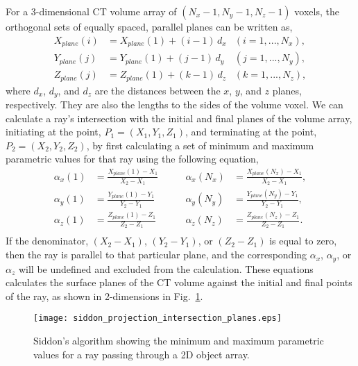 For a 3-dimensional CT volume array of $(N_x -1, N_y-1, N_z-1)$ voxels, the orthogonal sets of equally spaced, parallel planes can be written as,
%
\begin{equation}
	\begin{aligned}
		X_{plane}(i) & = X_{plane}(1) + (i-1)\, d_x 	&(i = 1, ..., N_x),\\ 
		Y_{plane}(j) & = Y_{plane}(1) + (j-1)\, d_y  	&(j = 1, ..., N_y),\\
		Z_{plane}(j) & = Z_{plane}(1) + (k-1)\, d_z		&(k = 1, ..., N_z),
	\end{aligned}
	\label{eq:siddon_planes}
\end{equation}
%
where $d_x$, $d_y$, and $d_z$ are the distances between the $x$, $y$, and $z$ planes, respectively.  They are also the lengths to the sides of the volume voxel.  We can calculate a ray's intersection with the initial and final planes of the volume array, initiating at the point, $P_1 = (X_1, Y_1, Z_1)$, and terminating at the point, $P_2 = (X_2, Y_2, Z_2)$, by first calculating a set of minimum and maximum parametric values for that ray using the following equation,
%
\begin{equation}
\begin{aligned}
\alpha_x(1) &= \frac{X_{plane}(1) - X_1}{X_2 - X_1} \qquad &\alpha_x(N_x) &= \frac{X_{plane}(N_x) - X_1}{X_2 - X_1}, \\
\alpha_y(1) &= \frac{Y_{plane}(1) - Y_1}{Y_2 - Y_1} \qquad &\alpha_y(N_y) &= \frac{Y_{plane}(N_y) - Y_1}{Y_2 - Y_1}, \\
\alpha_z(1) &= \frac{Z_{plane}(1) - Z_1}{Z_2 - Z_1} \qquad &\alpha_z(N_z) &= \frac{Z_{plane}(N_z) - Z_1}{Z_2 - Z_1}. \\
\end{aligned}
\label{eq:siddon_alpha_extremes}
\end{equation}
%
If the denominator, $(X_2 - X_1)$, $(Y_2-Y_1)$, or $(Z_2 - Z_1)$ is equal to zero, then the ray is parallel to that particular plane, and the corresponding $\alpha_x$, $\alpha_y$, or $\alpha_z$ will be undefined and excluded from the calculation.  These equations calculates the surface planes of the CT volume against the initial and final points of the ray, as shown in 2-dimensions in Fig.~\ref{fig:siddon_intersection_planes}.
%
\begin{figure}[ht]
\centering
\texttt{[image: siddon\_projection\_intersection\_planes.eps]}
\caption{Siddon's algorithm showing the minimum and maximum parametric values for a ray passing through a 2D object array.}
\label{fig:siddon_intersection_planes}
\end{figure}

